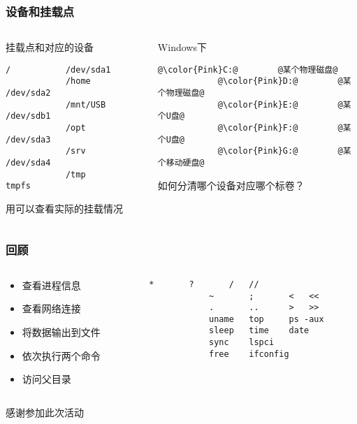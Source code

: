 \begin{frame} [fragile]
	\frametitle{设备和挂载点}
	\linespread{1.5}
	\begin{columns}[T]
		\begin{column}[T]{.5\textwidth}
			挂载点和对应的设备
			\begin{lstlisting}[style=bashstyle, gobble=12, texcl]
			/			/dev/sda1
			/home		/dev/sda2
			/mnt/USB	/dev/sdb1
			/opt		/dev/sda3
			/srv		/dev/sda4
			/tmp		tmpfs
			\end{lstlisting}
			用可以查看实际的挂载情况
		\end{column}
		\begin{column}[T]{.5\textwidth}
			Windows下
			\begin{lstlisting}[style=bashstyle, gobble=12, texcl, escapechar=@]
			@\color{Pink}C:@		@某个物理磁盘@
			@\color{Pink}D:@		@某个物理磁盘@
			@\color{Pink}E:@		@某个U盘@
			@\color{Pink}F:@		@某个U盘@
			@\color{Pink}G:@		@某个移动硬盘@
			\end{lstlisting}
			如何分清哪个设备对应哪个标卷？
		\end{column}
	\end{columns}
\end{frame}

\begin{frame} [fragile]
	\frametitle{回顾}
	\linespread{1.5}
	\begin{columns}[T]
		\begin{column}[T]{.5\textwidth}
			\begin{itemize}
			\item 查看进程信息
			\item 查看网络连接
			\item 将数据输出到文件
			\item 依次执行两个命令
			\item 访问父目录
			\end{itemize}
		\end{column}
		\begin{column}[T]{.5\textwidth}
			\begin{lstlisting}[style=bashstyle, gobble=12, texcl]
			*		?		/	//
			~		;		<	<<
			.		..		>	>>
			uname	top		ps -aux
			sleep	time	date
			sync	lspci
			free	ifconfig
			\end{lstlisting}
		\end{column}
	\end{columns}
\end{frame}

\PreLastFrame
\begin{frame}
	\centerline{\fontsize{32}{32}\selectfont 感谢参加此次活动}
\end{frame}

\newpage


